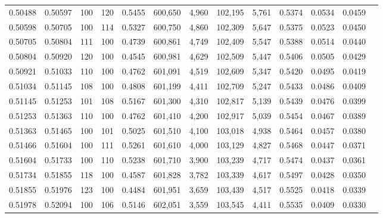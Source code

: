 \begin{tabular}{rrrrrrrrrrrrr}
0.50488 & 0.50597 &   100 & 120 &                                     0.5455 & 600,650 &   4,960 & 102,195 &   5,761 & 0.5374 & 0.0534 & 0.0459 \\
0.50598 & 0.50705 &   100 & 114 &                                     0.5327 & 600,750 &   4,860 & 102,309 &   5,647 & 0.5375 & 0.0523 & 0.0450 \\
0.50705 & 0.50804 &   111 & 100 &                                     0.4739 & 600,861 &   4,749 & 102,409 &   5,547 & 0.5388 & 0.0514 & 0.0440 \\
0.50804 & 0.50920 &   120 & 100 &                                     0.4545 & 600,981 &   4,629 & 102,509 &   5,447 & 0.5406 & 0.0505 & 0.0429 \\
0.50921 & 0.51033 &   110 & 100 &                                     0.4762 & 601,091 &   4,519 & 102,609 &   5,347 & 0.5420 & 0.0495 & 0.0419 \\
0.51034 & 0.51145 &   108 & 100 &                                     0.4808 & 601,199 &   4,411 & 102,709 &   5,247 & 0.5433 & 0.0486 & 0.0409 \\
0.51145 & 0.51253 &   101 & 108 &                                     0.5167 & 601,300 &   4,310 & 102,817 &   5,139 & 0.5439 & 0.0476 & 0.0399 \\
0.51253 & 0.51363 &   110 & 100 &                                     0.4762 & 601,410 &   4,200 & 102,917 &   5,039 & 0.5454 & 0.0467 & 0.0389 \\
0.51363 & 0.51465 &   100 & 101 &                                     0.5025 & 601,510 &   4,100 & 103,018 &   4,938 & 0.5464 & 0.0457 & 0.0380 \\
0.51466 & 0.51604 &   100 & 111 &                                     0.5261 & 601,610 &   4,000 & 103,129 &   4,827 & 0.5468 & 0.0447 & 0.0371 \\
0.51604 & 0.51733 &   100 & 110 &                                     0.5238 & 601,710 &   3,900 & 103,239 &   4,717 & 0.5474 & 0.0437 & 0.0361 \\
0.51734 & 0.51855 &   118 & 100 &                                     0.4587 & 601,828 &   3,782 & 103,339 &   4,617 & 0.5497 & 0.0428 & 0.0350 \\
0.51855 & 0.51976 &   123 & 100 &                                     0.4484 & 601,951 &   3,659 & 103,439 &   4,517 & 0.5525 & 0.0418 & 0.0339 \\
0.51978 & 0.52094 &   100 & 106 &                                     0.5146 & 602,051 &   3,559 & 103,545 &   4,411 & 0.5535 & 0.0409 & 0.0330 \\

\end{tabular}

